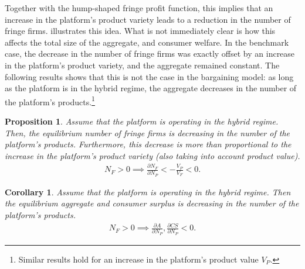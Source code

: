 \documentclass[a4paper]{article}
\newtheorem{proposition}{Proposition}
\newtheorem{corollary}{Corollary}
\begin{document}
Together with the hump-shaped fringe profit function, this implies that an increase in the platform's product variety leads to a reduction in the number of fringe firms.
 illustrates this idea.
What is not immediately clear is how this affects the total size of the aggregate, and consumer welfare.
In the benchmark case, the decrease in the number of fringe firms was exactly offset by an increase in the platform's product variety, and the aggregate remained constant.
The following results shows that this is not the case in the bargaining model: as long as the platform is in the hybrid regime, the aggregate decreases in the number of the platform's products.\footnote{
    Similar results hold for an increase in the platform's product value $V_P$.
}

\begin{proposition}
    Assume that the platform is operating in the hybrid regime. Then, the equilibrium number of fringe firms is decreasing in the number of the platform's products. Furthermore, this decrease is more than proportional to the increase in the platform's product variety (also taking into account product value).
    \begin{align*}
        N_F > 0 \implies \frac{\partial N_F}{\partial N_P} < -\frac{V_P}{V_F} < 0.
    \end{align*}
\end{proposition}

\begin{corollary}
    Assume that the platform is operating in the hybrid regime. Then the equilibrium aggregate and consumer surplus is decreasing in the number of the platform's products.
    \begin{align*}
        N_F > 0 \implies \frac{\partial A}{\partial N_P}, \frac{\partial CS}{\partial N_P} < 0.
    \end{align*}
\end{corollary}
\end{document}
